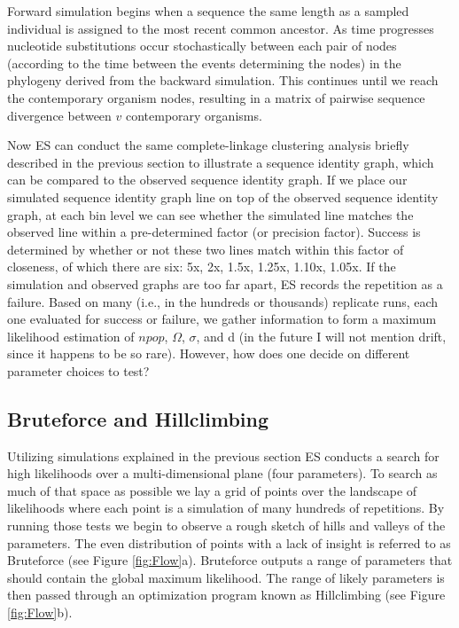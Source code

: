 Forward simulation begins when a sequence the same length as a sampled individual is assigned to the most recent common ancestor.
As time progresses nucleotide substitutions occur stochastically between each pair of nodes (according to the time between the events determining the nodes) in the phylogeny derived from the backward simulation. 
This continues until we reach the contemporary organism nodes, resulting in a matrix of pairwise sequence divergence between $v$ contemporary organisms.

Now ES can conduct the same complete-linkage clustering analysis briefly described in the previous section to illustrate a sequence identity graph, which can be compared to the observed sequence identity graph.
If we place our simulated sequence identity graph line on top of the observed sequence identity graph, at each bin level we can see whether the simulated line matches the observed line within a pre-determined factor (or precision factor).
Success is determined by whether or not these two lines match within this factor of closeness, of which there are six: 5x, 2x, 1.5x, 1.25x, 1.10x, 1.05x.
If the simulation and observed graphs are too far apart, ES records the repetition as a failure.
Based on many (i.e., in the hundreds or thousands) replicate runs, each one evaluated for success or failure, we gather information to form a maximum likelihood estimation of $npop$, $\Omega$, $\sigma$, and d (in the future I will not mention drift, since it happens to be so rare). However, how does one decide on different parameter choices to test?

\subsection*{Bruteforce and Hillclimbing}
Utilizing simulations explained in the previous section ES conducts a search for high likelihoods over a multi-dimensional plane (four parameters).
To search as much of that space as possible we lay a grid of points over the landscape of likelihoods where each point is a simulation of many hundreds of repetitions.
By running those tests we begin to observe a rough sketch of hills and valleys of the parameters.
The even distribution of points with a lack of insight is referred to as Bruteforce (see Figure \ref{fig:Flow}a).
Bruteforce outputs a range of parameters that should contain the global maximum likelihood.
The range of likely parameters is then passed through an optimization program known as Hillclimbing (see Figure \ref{fig:Flow}b).

